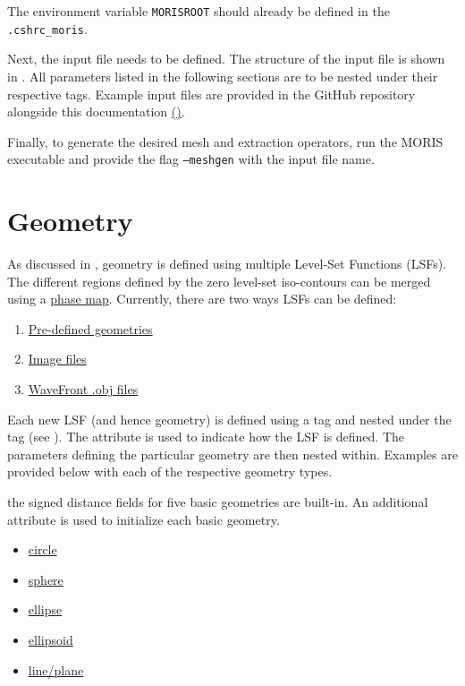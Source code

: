 \vspace{-0.5cm}

The environment variable \texttt{MORISROOT} should already be defined in the \texttt{.cshrc\_moris}.

Next, the input file needs to be defined. The structure of the input file is shown in . All parameters listed in the following sections are to be nested under their respective tags. Example input files are provided in the GitHub repository alongside this documentation \href{https://github.com/kkmaute/moris/tree/main/share/doc/mesh_generation/examples}{(\ExternalLink)}.

Finally, to generate the desired mesh and extraction operators, run the MORIS executable and provide the flag \texttt{---meshgen} with the input file name. 



\section{Geometry}
\label{sec:tutorial_geometry}

As discussed in , geometry is defined using multiple Level-Set Functions (LSFs). The different regions defined by the zero level-set iso-contours can be merged using a \hyperlink{phase_map}{phase map}. Currently, there are two ways LSFs can be defined:
\begin{enumerate}
    \item \hyperlink{pre_defined}{Pre-defined geometries}
    \item \hyperlink{image_file}{Image files}
    \item \hyperlink{object_file}{WaveFront .obj files}
\end{enumerate}
Each new LSF (and hence geometry) is defined using a  tag and nested under the  tag (see ). The  attribute is used to indicate how the LSF is defined. The parameters defining the particular geometry are then nested within. Examples are provided below with each of the respective geometry types.

 the signed distance fields for five basic geometries are built-in. An additional  attribute is used to initialize each basic geometry.
\begin{multicols}{3}
\begin{itemize}
    \item \hyperlink{circle}{circle}
    \item \hyperlink{sphere}{sphere}
    \item \hyperlink{ellipse}{ellipse}
    \item \hyperlink{ellipsoid}{ellipsoid}
    \item \hyperlink{plane}{line/plane}
\end{itemize}
\end{multicols}

